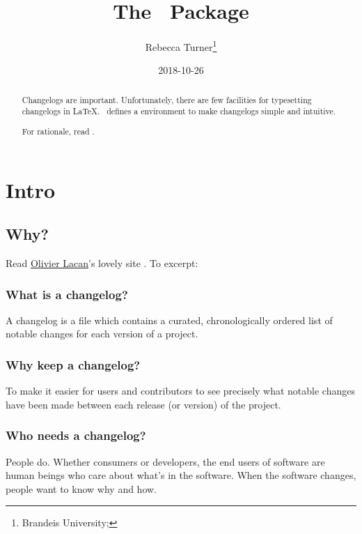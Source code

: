 \documentclass{ltxdoc}
\author{Rebecca Turner\thanks{Brandeis University; \email{rebeccaturner@brandeis.edu}}}
\title{The \cl\ Package}
\date{2018-10-26}
\begin{document}
\maketitle

\begin{abstract}
	Changelogs are important. Unfortunately, there are few facilities
	for typesetting changelogs in \LaTeX. \cl\ defines a 
	environment to make changelogs simple and intuitive.
	
	For rationale, read .
\end{abstract}


\tableofcontents
\vfill
\pagebreak

\section{Intro}

\subsection{Why?}

Read \href{https://olivierlacan.com/}{Olivier Lacan}'s lovely site
. To excerpt:

\begin{adjustwidth}{1in}{1in}
	\subsubsection{What is a changelog?}
	A changelog is a file which contains a curated, chronologically
	ordered list of notable changes for each version of a project.

	\subsubsection{Why keep a changelog?}
	To make it easier for users and contributors to see precisely what
	notable changes have been made between each release (or version) of
	the project.

	\subsubsection{Who needs a changelog?}
	People do. Whether consumers or developers, the end users of
	software are human beings who care about what's in the software.
	When the software changes, people want to know why and how.
\end{adjustwidth}
\end{document}
